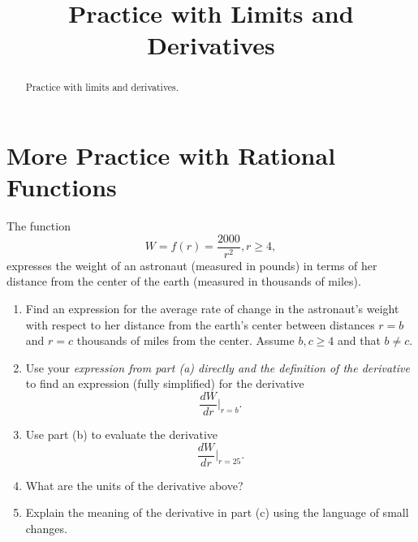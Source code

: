 \documentclass{ximera}
\title{Practice with Limits and Derivatives}
\begin{document}
\begin{abstract}
Practice with limits and derivatives.
\end{abstract}
\maketitle


\section{More Practice with Rational Functions}

\begin{question} \label{QPODFDgdfgfg}
The function
\[
        W = f(r) = \frac{2000}{r^2} , r\geq 4 ,
\]
expresses the weight of an astronaut (measured in pounds) in terms of her distance from the center of the earth (measured in thousands of miles).

\begin{enumerate}
\item  Find an expression for the average rate of change in the astronaut's weight with respect to her distance from the earth's center between distances $r=b$ and $r=c$ thousands of miles from the center. Assume $b,c\geq 4$ and that $b\neq c$.

\item Use your \emph{expression from part (a) directly and the definition of the derivative} to find an expression (fully simplified) for the derivative
\[
   \frac{dW}{dr}\Big|_{r=b} .
\]

\item Use part (b) to evaluate the derivative
\[
   \frac{dW}{dr}\Big|_{r=25} .
\]

\item What are the units of the derivative above?

\item Explain the meaning of the derivative in part (c) using the language of small changes.
\end{enumerate}

\end{question}
\end{document}
